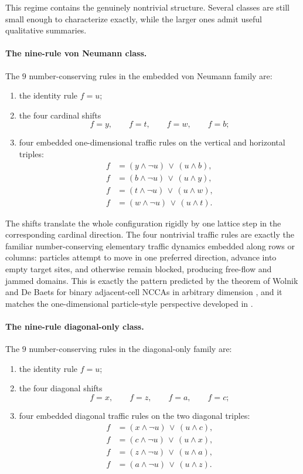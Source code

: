 \documentclass[11pt,a4paper]{article}
\begin{document}
This regime contains the genuinely nontrivial structure.  Several classes are still small enough
to characterize exactly, while the larger ones admit useful qualitative summaries.

\paragraph{The nine-rule von Neumann class.}
The \(9\) number-conserving rules in the embedded von Neumann family are:
\begin{enumerate}
\item the identity rule \(f=u\);
\item the four cardinal shifts
\[
f=y,\qquad f=t,\qquad f=w,\qquad f=b;
\]
\item four embedded one-dimensional traffic rules on the vertical and horizontal triples:
\begin{align*}
f &= (y\wedge \neg u)\,\vee\,(u\wedge b),\\
f &= (b\wedge \neg u)\,\vee\,(u\wedge y),\\
f &= (t\wedge \neg u)\,\vee\,(u\wedge w),\\
f &= (w\wedge \neg u)\,\vee\,(u\wedge t).
\end{align*}
\end{enumerate}

The shifts translate the whole configuration rigidly by one lattice step in the corresponding
cardinal direction.  The four nontrivial traffic rules are exactly the familiar number-conserving
elementary traffic dynamics embedded along rows or columns: particles attempt to move in one
preferred direction, advance into empty target sites, and otherwise remain blocked, producing
free-flow and jammed domains.  This is exactly the pattern predicted by the theorem of Wolnik and
De Baets for binary adjacent-cell NCCAs in arbitrary dimension \cite{WolnikDeBaets2019}, and it
matches the one-dimensional particle-style perspective developed in
\cite{MoreiraBoccaraGoles2004}.

\paragraph{The nine-rule diagonal-only class.}
The \(9\) number-conserving rules in the diagonal-only family are:
\begin{enumerate}
\item the identity rule \(f=u\);
\item the four diagonal shifts
\[
f=x,\qquad f=z,\qquad f=a,\qquad f=c;
\]
\item four embedded diagonal traffic rules on the two diagonal triples:
\begin{align*}
f &= (x\wedge \neg u)\,\vee\,(u\wedge c),\\
f &= (c\wedge \neg u)\,\vee\,(u\wedge x),\\
f &= (z\wedge \neg u)\,\vee\,(u\wedge a),\\
f &= (a\wedge \neg u)\,\vee\,(u\wedge z).
\end{align*}
\end{enumerate}
\end{document}
